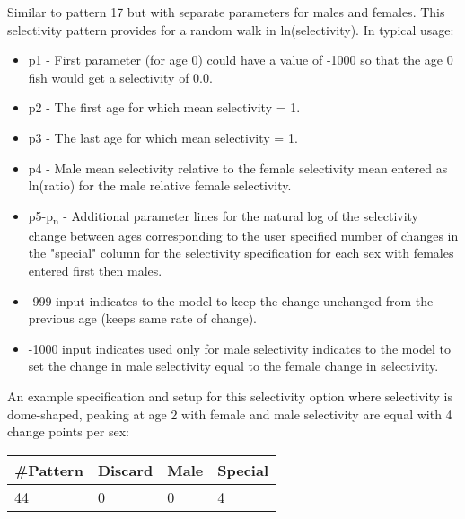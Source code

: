 Similar to pattern 17 but with separate parameters for males and females. This selectivity pattern provides for a random walk in ln(selectivity).  In typical usage:
	\begin{itemize}
		\item p1 - First parameter (for age 0) could have a value of -1000 so that the age 0 fish would get a selectivity of 0.0.
		\item p2 - The first age for which mean selectivity = 1.
		\item p3 - The last age for which mean selectivity = 1.
		\item p4 - Male mean selectivity relative to the female selectivity mean entered as ln(ratio) for the male relative female selectivity.
		\item p5-p\textsubscript{n} - Additional parameter lines for the natural log of the selectivity change between ages corresponding to the user specified number of changes in the "special" column for the selectivity specification for each sex with females entered first then males.
		\item -999 input indicates to the model to keep the change unchanged from the previous age (keeps same rate of change).
		\item -1000 input indicates used only for male selectivity indicates to the model to set the change in male selectivity equal to the female change in selectivity.
	\end{itemize}
	
An example specification and setup for this selectivity option where selectivity is dome-shaped, peaking at age 2 with female and male selectivity are equal with 4 change points per sex:
	\begin{center}
		\begin{longtable}{p{1.5cm} p{1.5cm} p{1.5cm} p{1.5cm} }
			\hline
			\#Pattern & Discard & Male & Special\Tstrut\Bstrut\\
			\hline
			44 & 0 & 0 & 4 \Tstrut\Bstrut\\
			\hline
		\end{longtable}
	\end{center}


